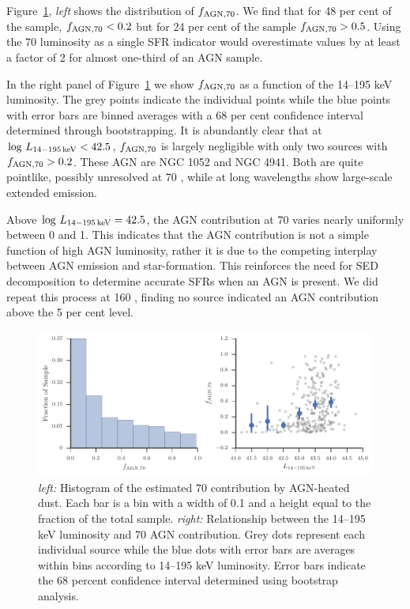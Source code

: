 \documentclass[fleqn, usenatbib]{mnras}
\begin{document}
Figure~\ref{fig:70um_agn_contribution}, \textit{left} shows the distribution of $f_{\rm AGN, 70}$. We find that for 48 per cent of the sample,  $f_{\rm AGN, 70} < 0.2$ but for 24 per cent of the sample $f_{\rm AGN, 70} > 0.5$. Using the 70 \micron{} luminosity as a single SFR indicator would overestimate values by at least a factor of 2 for almost one-third of an AGN sample. 

In the right panel of Figure~\ref{fig:70um_agn_contribution} we show $f_{\rm AGN, 70}$ as a function of the 14--195 keV luminosity. The grey points indicate the individual points while the blue points with error bars are binned averages with a 68 per cent confidence interval determined through bootstrapping. It is abundantly clear that at $\log\,L_{\rm 14-195\,keV} < 42.5$, $f_{\rm AGN, 70}$ is largely negligible with only two sources with $f_{\rm AGN, 70} > 0.2$. These AGN are NGC 1052 and NGC 4941. Both are quite pointlike, possibly unresolved at 70 \micron, while at long wavelengths show large-scale extended emission.

Above $\log\,L_{\rm 14-195\,keV} = 42.5$, the AGN contribution at 70 \micron{} varies nearly uniformly between 0 and 1. This indicates that the AGN contribution is not a simple function of high AGN luminosity, rather it is due to the competing interplay between AGN emission and star-formation. This reinforces the need for SED decomposition to determine accurate SFRs when an AGN is present. We did repeat this process at 160 \micron, finding no source indicated an AGN contribution above the 5 per cent level.


\begin{figure}
\includegraphics{figures/pacs_AGN_contribution}
\caption{\textit{left:} Histogram of the estimated 70 \micron{} contribution by AGN-heated dust. Each bar is a bin with a width of 0.1 and a height equal to the fraction of the total sample. \textit{right:} Relationship between the 14--195 keV luminosity and 70 \micron{} AGN contribution. Grey dots represent each individual source while the blue dots with error bars are averages within bins according to 14--195 keV luminosity. Error bars indicate the 68 percent confidence interval determined using bootstrap analysis.\label{fig:70um_agn_contribution}}
\end{figure}
\end{document}
